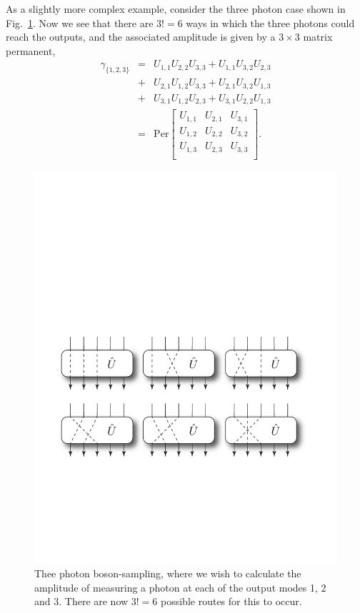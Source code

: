 \documentclass[aps,pra,twocolumn,amsmath,amssymb,nofootinbib,superscriptaddress]{revtex4}
\begin{document}
As a slightly more complex example, consider the three photon case shown in Fig.~\ref{fig:three_photon_perm}. Now we see that there are \mbox{$3!=6$} ways in which the three photons could reach the outputs, and the associated amplitude is given by a \mbox{$3\times 3$} matrix permanent,
\begin{eqnarray} \label{eq:coinProbEx3}
\gamma_{\{1,2,3\}} &=& U_{1,1}U_{2,2}U_{3,3} + U_{1,1}U_{3,2}U_{2,3} \nonumber \\
&+& U_{2,1}U_{1,2}U_{3,3} + U_{2,1}U_{3,2}U_{1,3} \nonumber \\
&+& U_{3,1}U_{1,2}U_{2,3} + U_{3,1}U_{2,2}U_{1,3}
\nonumber \\
&=& \mathrm{Per} \left[ {\begin{array}{ccc}
   U_{1,1} & U_{2,1} & U_{3,1} \\
   U_{1,2} & U_{2,2} & U_{3,2} \\
   U_{1,3} & U_{2,3} & U_{3,3} \\
  \end{array} } \right].
\end{eqnarray}

\begin{figure}[!htb]
\includegraphics[width=\columnwidth]{three_photon_combinatorics}
\caption{Thee photon boson-sampling, where we wish to calculate the amplitude of measuring a photon at each of the output modes 1, 2 and 3. There are now \mbox{$3!=6$} possible routes for this to occur.} \label{fig:three_photon_perm}
\end{figure}
\end{document}
